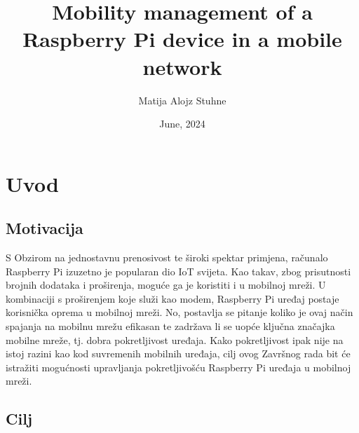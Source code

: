 \documentclass[zavrsnirad]{fer}
\title{Mobility management of a Raspberry Pi device in a mobile network}
\author{Matija Alojz Stuhne}
\date{June, 2024}
\begin{document}
\maketitle






\begin{zahvale}
\end{zahvale}


\mainmatter


\tableofcontents


\chapter{Uvod}
\label{pog:uvod}

\section{Motivacija}

S Obzirom na jednostavnu prenosivost te široki spektar primjena, računalo Raspberry Pi izuzetno je
popularan dio IoT svijeta. Kao takav, zbog prisutnosti brojnih dodataka i proširenja, moguće ga je koristiti
i u mobilnoj mreži. U kombinaciji s proširenjem koje služi kao modem, Raspberry Pi uređaj postaje
korisnička oprema u mobilnoj mreži. No, postavlja se pitanje koliko je ovaj način spajanja na mobilnu mrežu
efikasan te zadržava li se uopće ključna značajka mobilne mreže, tj. dobra pokretljivost uređaja.
Kako pokretljivost ipak nije na istoj razini kao kod suvremenih mobilnih uređaja,
cilj ovog Završnog rada bit će istražiti mogućnosti upravljanja pokretljivošću Raspberry Pi uređaja
u mobilnoj mreži.

\section{Cilj}
\end{document}
